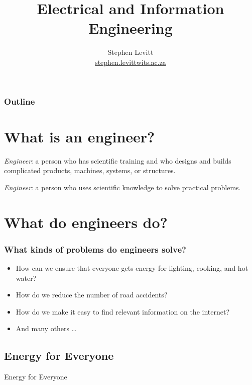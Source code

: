 \documentclass{beamer}
\title{Electrical and Information Engineering}
\author[SP Levitt]{Stephen Levitt\\\href{mailto:stephen.levitt@wits.ac.za}{stephen.levitt{\small\MVAt}wits.ac.za}}
\begin{document}
\titleslide

\begin{frame}
    \frametitle{Outline}
    \tableofcontents[hideallsubsections]
\end{frame}

\section{What is an engineer?}


\begin{frame}
\begin{unsignedquote}
 \textit{Engineer}: a person who has scientific training and who designs and builds complicated products, machines, systems, or structures.
\end{unsignedquote}

\vspace{5mm}

\begin{unsignedquote}
 \textit{Engineer}:  a person who uses scientific knowledge to \alert{solve practical problems}.
\end{unsignedquote}
\end{frame}

\section{What do engineers do?}
\begin{frame}
\frametitle{What kinds of problems do engineers solve?}
  \begin{itemize}
    \item How can we ensure that everyone gets energy for lighting, cooking, and hot water?
    \item How do we reduce the number of road accidents?
    \item How do we make it easy to find relevant information on the internet?
    \item And many others \ldots
  \end{itemize}
\end{frame}

\subsection{Energy for Everyone}
\begin{frame}[plain,c]
\begin{center}
\Huge Energy for Everyone
\end{center}
\end{frame}
\end{document}

